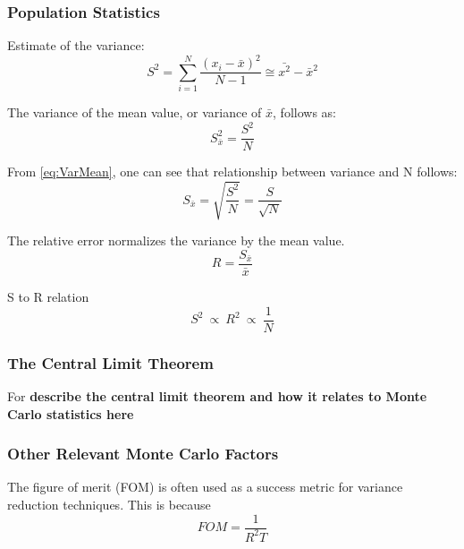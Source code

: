 \subsubsection{Population Statistics}

Estimate of the variance:
\begin{equation}
S^{ 2 }=\sum _{ i=1 }^{ N }{ \frac { (x_{ i }-\bar { x } )^{ 2 } }{ N-1 }  }
             \cong \bar{x^2}-\bar{x}^2
\label{eq:Var}
\end{equation}

The variance of the mean value, or variance of $\bar{x}$, follows as:
\begin{equation}
S^{ 2 }_{ \bar { x }  }=\frac{S^2}{N}
\label{eq:VarMean}
\end{equation}

From \ref{eq:VarMean}, one can see that relationship between variance and N follows:
\begin{equation}
S_{ \bar { x }  }=\sqrt { \frac { S^{ 2 } }{ N }  } =\frac { S }{ \sqrt { N }  }
\label{eq:VarN}
\end{equation}

The relative error normalizes the variance by the mean value.
\begin{equation}
R = \frac{S_{ \bar { x }  }}{\bar{x}}
\label{eq:RelativeErr}
\end{equation}

S to R relation
\begin{equation}
S^2\:\propto\: R^2\:\propto\:\frac{1}{N}
\label{eq:S to R}
\end{equation}

\subsubsection{The Central Limit Theorem}

For
\textbf{describe the central limit theorem and how it relates to Monte Carlo
statistics here }

\subsubsection{Other Relevant Monte Carlo Factors}

The figure of merit (FOM) is often used as a success metric for variance
reduction techniques.
This is because
\begin{equation}
FOM=\frac { 1 }{ R^{ 2 }T }
\label{eq:FOM}
\end{equation}


